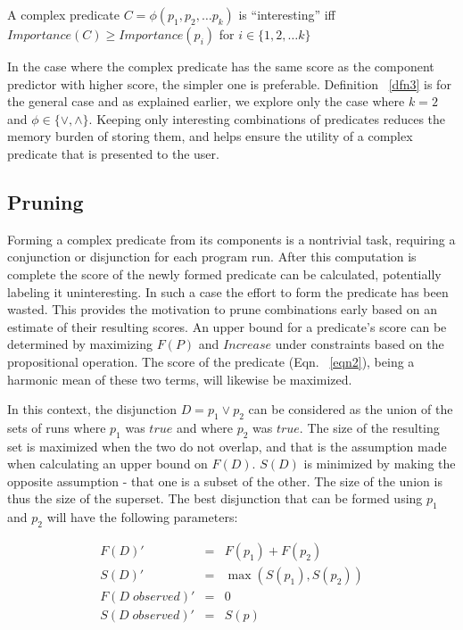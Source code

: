 \begin{defn}
\label{dfn3}
A complex predicate $C = \phi(p_1, p_2, \ldots p_k)$ is ``interesting'' iff $Importance(C) \geq Importance(p_i)$ for $i \in \{1, 2, \ldots k\}$
\end{defn}

In the case where the complex predicate has the same score as the component predictor with higher score, the simpler one is preferable.  Definition ~\ref{dfn3} is for the general case and as explained earlier, we explore only the case where $k = 2$ and $\phi \in \{\vee, \wedge\}$.  Keeping only interesting combinations of predicates reduces the memory burden of storing them, and helps ensure the utility of a complex predicate that is presented to the user.

\subsection{Pruning}
\label{sec-pruning}
Forming a complex predicate from its components is a nontrivial task, requiring a conjunction or disjunction for each program run.  After this computation is complete the score of the newly formed predicate can be calculated, potentially labeling it uninteresting.  In such a case the effort to form the predicate has been wasted.  This provides the motivation to prune combinations early based on an estimate of their resulting scores.  An upper bound for a predicate's score can be determined by maximizing $F(P)$ and $Increase$ under constraints based on the propositional operation.  The score of the predicate (Eqn. ~\ref{eqn2}), being a harmonic mean of these two terms, will likewise be maximized.

In this context, the disjunction $D = p_1 \vee p_2$ can be considered as the union of the sets of runs where $p_1$ was $true$ and where $p_2$ was $true$.  The size of the resulting set is maximized when the two do not overlap, and that is the assumption made when calculating an upper bound on $F(D)$.  $S(D)$ is minimized by making the opposite assumption - that one is a subset of the other.  The size of the union is thus the size of the superset.  The best disjunction that can be formed using $p_1$ and $p_2$ will have the following parameters:

\begin{eqnarray}
 \nonumber %
  F(D)' &=&  F(p_1) + F(p_2) \\
 \nonumber
  S(D)' &=&  \max(S(p_1),S(p_2)) \\
 \nonumber
  F(D\;observed)' &=& 0 \\
 \nonumber
  S(D\;observed)' &=& S(p)
\end{eqnarray}

